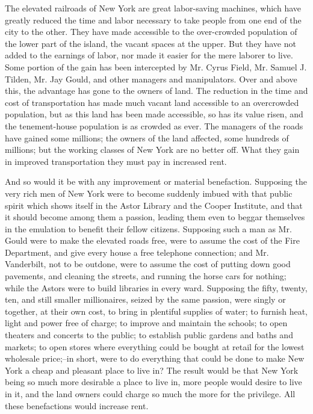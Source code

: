 \documentclass{book}
\begin{document}
The elevated railroads of New York are great labor-saving machines, which have greatly reduced the time and labor necessary to take people from one end of the city to the other. They have made accessible to the over-crowded population of the lower part of the island, the vacant spaces at the upper. But they have not added to the earnings of labor, nor made it easier for the mere laborer to live. Some portion of the gain has been intercepted by Mr. Cyrus Field, Mr. Samuel J. Tilden, Mr. Jay Gould, and other managers and manipulators. Over and above this, the advantage has gone to the owners of land. The reduction in the time and cost of transportation has made much vacant land accessible to an overcrowded population, but as this land has been made accessible, so has its value risen, and the tenement-house population is as crowded as ever. The managers of the roads have gained some millions; the owners of the land affected, some hundreds of millions; but the working classes of New York are no better off. What they gain in improved transportation they must pay in increased rent.

And so would it be with any improvement or material benefaction. Supposing the very rich men of New York were to become suddenly imbued with that public spirit which shows itself in the Astor Library and the Cooper Institute, and that it should become among them a passion, leading them even to beggar themselves in the emulation to benefit their fellow citizens. Supposing such a man as Mr. Gould were to make the elevated roads free, were to assume the cost of the Fire Department, and give every house a free telephone connection; and Mr. Vanderbilt, not to be outdone, were to assume the cost of putting down good pavements, and cleaning the streets, and running the horse cars for nothing; while the Astors were to build libraries in every ward. Supposing the fifty, twenty, ten, and still smaller millionaires, seized by the same passion, were singly or together, at their own cost, to bring in plentiful supplies of water; to furnish heat, light and power free of charge; to improve and maintain the schools; to open theaters and concerts to the public; to establish public gardens and baths and markets; to open stores where everything could be bought at retail for the lowest wholesale price;–in short, were to do everything that could be done to make New York a cheap and pleasant place to live in? The result would be that New York being so much more desirable a place to live in, more people would desire to live in it, and the land owners could charge so much the more for the privilege. All these benefactions would increase rent.
\end{document}
